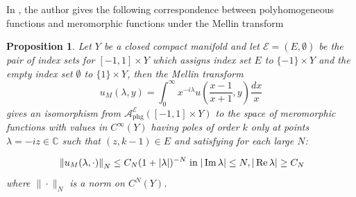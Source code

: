 \documentclass[a4paper,11pt]{article}
\newcounter{mythm}[section]
\newtheorem{pr}[mythm]{Proposition}
\begin{document}
In \cite[Proposition 5.27]{melrose_atiyah-patodi-singer_1993}, the author gives the following correspondence between polyhomogeneous functions and meromorphic functions under the Mellin transform  
\begin{pr}
Let $Y$ be a closed compact manifold  and let $\mathcal{E}=(E, \emptyset)$ be the pair of index sets for $[-1,1] \times Y$ which assigns index set $E$ to $\{-1\} \times Y$ and the empty index set $\emptyset$ to $\{1\} \times Y$, then the Mellin transform
$$
u_M(\lambda, y)=\int_0^{\infty} x^{-i \lambda} u\left(\frac{x-1}{x+1}, y\right) \frac{d x}{x}
$$
gives an isomorphism from $\mathcal{A}_{\mathrm{phg}}^{\mathcal{E}}([-1,1] \times Y)$ to the space of meromorphic functions with values in $C^{\infty}(Y)$ having poles of order $k$ only at points $\lambda=-i z \in \mathbb{C}$ such that $(z, k-1) \in E$ and satisfying for each large $N$: 

 $$\hspace{0.1cm}\left\|u_M(\lambda, \cdot)\right\|_N \leq C_N(1+|\lambda|)^{-N} \hspace{0.1cm} \text{in}  \hspace{0.1cm} |\operatorname{Im} \lambda| \leq N,|\operatorname{Re} \lambda| \geq C_N$$
 where $\|\cdot\|_N$ is a norm on $C^N(Y)$.
 \end{pr}
\end{document}
